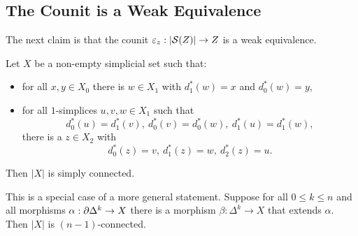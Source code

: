 \subsection{The Counit is a Weak Equivalence}

The next claim is that the counit $\epsilon_z:|\S(Z)|\to Z$ is a weak equivalence.

\begin{proposition}\label{proposition:simply-connected-realization}
Let $X$ be a non-empty simplicial set such that\alvaropls:
\begin{itemize}[label={-}]
    \item for all $x,y\in X_0$ there is $w\in X_1$ with $d_1^*(w)=x$ and $d_0^*(w)=y$,
    \item for all $1$-simplices $u,v,w\in X_1$ such that
    \[d_0^*(u)=d_1^*(v),\ d_0^*(v)=d_0^*(w),\ d_1^*(u)=d_1^*(w),\]
    there is a $z\in X_2$ with
    \[d_0^*(z)=v,\ d_1^*(z)=w,\ d_2^*(z)=u.\]
\end{itemize}
Then $|X|$ is simply connected.
\end{proposition}

\begin{remark}
This is a special case of a more general statement. Suppose for all $0\le k\le n$ and all morphisms $\alpha:\de\Delta^k\to X$ there is a morphism $\beta:\Delta^k\to X$ that extends $\alpha$. Then $|X|$ is $(n-1)$-connected.
\end{remark}

